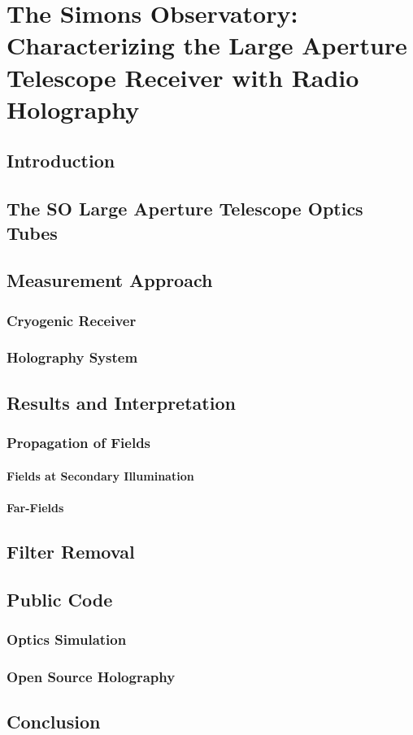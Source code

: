 \chapter{The Simons Observatory: Characterizing the Large Aperture Telescope Receiver with Radio Holography}

\section{Introduction}
\section{The SO Large Aperture Telescope Optics Tubes}
\section{Measurement Approach}
\subsection{Cryogenic Receiver}
\subsection{Holography System}
\section{Results and Interpretation}
\subsection{Propagation of Fields}
\subsubsection{Fields at Secondary Illumination}
\subsubsection{Far-Fields}
\section{Filter Removal}
\section{Public Code}
\subsection{Optics Simulation}
\subsection{Open Source Holography}
\section{Conclusion}